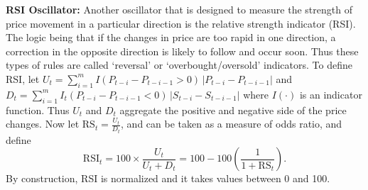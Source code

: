 \noindent\textbf{RSI Oscillator:} Another oscillator that is designed to measure the strength of price movement in a particular direction is the relative strength indicator (RSI). The logic being that if the changes in price are too rapid in one direction, a correction in the opposite direction is likely to follow and occur soon. Thus these types of rules are called `reversal' or `overbought/oversold' indicators. To define RSI, let $U_{t} = \sum_{i=1}^m I(P_{t-i} - P_{t-i-1} > 0)\,\lvert P_{t-i} - P_{t-i-1} \rvert$ and $D_{t} = \sum_{i=1}^m I_{t} (P_{t-i} - P_{t-i-1} < 0)\,\lvert S_{t-i} - S_{t-i-1}\rvert$ where $I(\cdot)$ is an indicator function. Thus $U_t$ and $D_t$ aggregate the positive and negative side of the price changes. Now let $\text{RS}_{t} = \frac {U_{t}}{D_{t}}$, and can be taken as a measure of odds ratio, and define
	\begin{equation} \label{eqn:rsi}
	\text{RSI}_{t} = 100 \times \frac{U_{t}}{U_{t} + D_{t}} = 100 - 100 \left( \dfrac{1}{1 + \text{RS}_t} \right).
	\end{equation}
By construction, RSI is normalized and it takes values between 0 and 100. \twomedskip


\noindent{} \twomedskip


